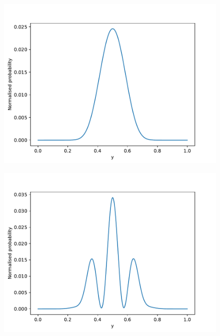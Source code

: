 \documentclass[english,notitlepage,reprint,nofootinbib]{revtex4-2}  %
\begin{document}
	\begin{figure}[h!]
		\centering
		\includegraphics[scale=0.55]{figures/single_slit_detection.pdf}
		\caption{}
		\label{fig:prob9_single}
	\end{figure}
	
	\begin{figure}[h!]
		\centering
		\includegraphics[scale=0.55]{figures/double_slit_detection.pdf}
		\caption{}
		\label{fig:prob9_double}
	\end{figure}
	
\end{document}
